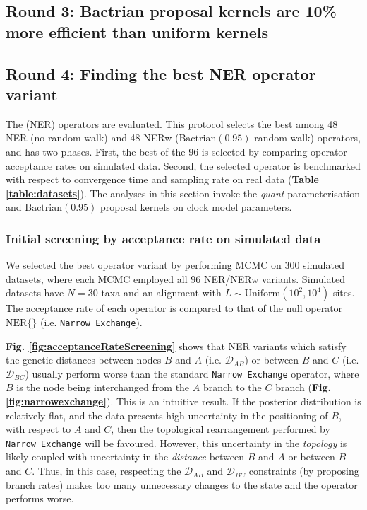 \documentclass[10pt,letterpaper]{article}
\begin{document}
\subsection*{Round 3: Bactrian proposal kernels are 10\% more efficient than uniform kernels}



\subsection*{Round 4: Finding the best NER operator variant}

The \textbf{} (NER) operators are evaluated. This protocol selects the best among 48 NER (no random walk) and 48 NERw ($\text{Bactrian}(0.95)$ random walk) operators, and has two phases. First, the best of the 96 is selected by comparing operator acceptance rates on simulated data. Second, the selected operator is benchmarked with respect to convergence time and sampling rate on real data (\textbf{Table \ref{table:datasets}}). The analyses in this section invoke the \textit{quant} parameterisation and $\text{Bactrian}(0.95)$ proposal kernels on clock model parameters.




\subsubsection*{Initial screening by acceptance rate on simulated data}


We selected the best operator variant by performing MCMC on 300 simulated datasets, where each MCMC employed all 96 NER/NERw variants. Simulated datasets have $N=30$ taxa and an alignment with $L \sim \text{Uniform}(10^2, 10^4)$ sites. The acceptance rate of each operator is compared to that of the null operator $\text{NER}\{\}$ (i.e. \texttt{Narrow Exchange}). 


\textbf{Fig. \ref{fig:acceptanceRateScreening}} shows that NER variants which satisfy the genetic distances between nodes $B$ and $A$ (i.e. $\mathcal{D}_{AB}$) or between $B$ and $C$ (i.e. $\mathcal{D}_{BC}$) usually perform worse than the standard \texttt{Narrow Exchange} operator, where $B$ is the node being interchanged from the $A$ branch to the $C$ branch (\textbf{Fig. \ref{fig:narrowexchange}}). 
This is an intuitive result. 
If the posterior distribution is relatively flat, and the data presents high uncertainty in the positioning of $B$, with respect to $A$ and $C$, then the topological rearrangement performed by \texttt{Narrow Exchange} will be favoured. However, this uncertainty in the \textit{topology} is likely coupled with uncertainty in the \textit{distance} between $B$ and $A$ or between $B$ and $C$. 
Thus, in this case, respecting the $\mathcal{D}_{AB}$ and $\mathcal{D}_{BC}$ constraints (by proposing branch rates) makes too many unnecessary changes to the state and the operator performs worse.
\end{document}
